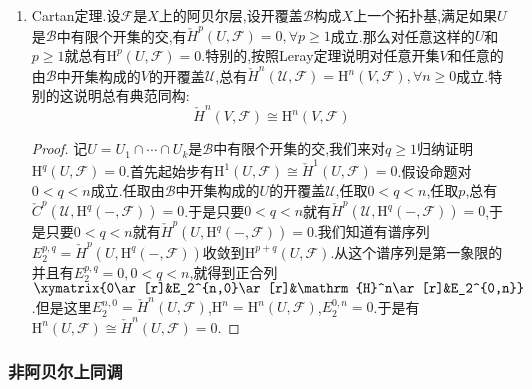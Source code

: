 \begin{enumerate}
\begin{proof}
		但是上一条引理说明$E_2^{0,1}=0$,导致$\check{H}^1(X,\mathscr{F})=E_2^{1,0}\cong\mathrm{H}^1(X,\mathscr{F})$.
	\end{proof}
	\item Cartan定理.设$\mathscr{F}$是$X$上的阿贝尔层,设开覆盖$\mathscr{B}$构成$X$上一个拓扑基,满足如果$U$是$\mathscr{B}$中有限个开集的交,有$\check{H}^p(U,\mathscr{F})=0,\forall p\ge1$成立.那么对任意这样的$U$和$p\ge1$就总有$\mathrm{H}^p(U,\mathscr{F})=0$.特别的,按照Leray定理说明对任意开集$V$和任意的由$\mathscr{B}$中开集构成的$V$的开覆盖$\mathscr{U}$,总有$\check{H}^n(\mathscr{U},\mathscr{F})=\mathrm{H}^n(V,\mathscr{F}),\forall n\ge0$成立.特别的这说明总有典范同构:
	$$\check{H}^n(V,\mathscr{F})\cong\mathrm{H}^n(V,\mathscr{F})$$
	\begin{proof}
		
		记$U=U_1\cap\cdots\cap U_k$是$\mathscr{B}$中有限个开集的交,我们来对$q\ge1$归纳证明$\mathrm{H}^q(U,\mathscr{F})=0$.首先起始步有$\mathrm{H}^1(U,\mathscr{F})\cong\check{H}^1(U,\mathscr{F})=0$.假设命题对$0<q<n$成立.任取由$\mathscr{B}$中开集构成的$U$的开覆盖$\mathscr{U}$,任取$0<q<n$,任取$p$,总有$\check{C}^p(\mathscr{U},\mathrm{H}^q(-,\mathscr{F}))=0$.于是只要$0<q<n$就有$\check{H}^p(\mathscr{U},\mathrm{H}^q(-,\mathscr{F}))=0$,于是只要$0<q<n$就有$\check{H}^p(U,\mathrm{H}^q(-,\mathscr{F}))=0$.我们知道有谱序列$E_2^{p,q}=\check{H}^p(U,\mathrm{H}^q(-,\mathscr{F}))$收敛到$\mathrm{H}^{p+q}(U,\mathscr{F})$.从这个谱序列是第一象限的并且有$E_2^{p,q}=0,0<q<n$,就得到正合列$\xymatrix{0\ar[r]&E_2^{n,0}\ar[r]&\mathrm{H}^n\ar[r]&E_2^{0,n}}$.但是这里$E_2^{n,0}=\check{H}^n(U,\mathscr{F})$,$\mathrm{H}^n=\mathrm{H}^n(U,\mathscr{F})$,$E_2^{0,n}=0$.于是有$\mathrm{H}^n(U,\mathscr{F})\cong\check{H}^n(U,\mathscr{F})=0$.
	\end{proof}
\end{enumerate}
\subsubsection{非阿贝尔上同调}

